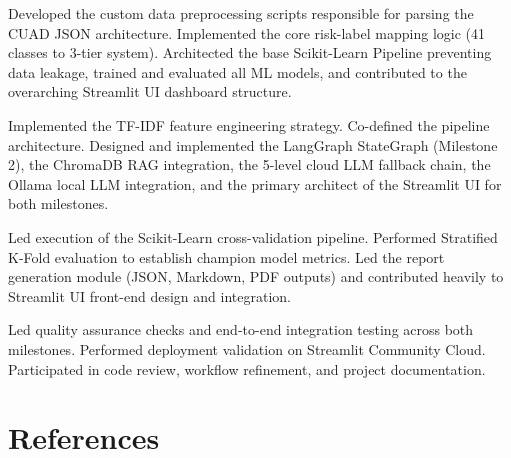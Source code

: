 \documentclass[12pt,a4paper]{article}
\begin{document}
\begin{description}[style=multiline, leftmargin=4cm]

    \item[\textbf{Ashutosh Singh} \\ (2401010109)]
    Developed the custom data preprocessing scripts responsible for parsing the CUAD
    JSON architecture. Implemented the core risk-label mapping logic (41 classes to
    3-tier system). Architected the base Scikit-Learn Pipeline preventing data
    leakage, trained and evaluated all ML models, and contributed to the overarching
    Streamlit UI dashboard structure.

    \vspace{0.2cm}
    \item[\textbf{Ranvendra Pratap} \\ \textbf{Singh} \\ (2401010373)]
    Implemented the TF-IDF feature engineering strategy. Co-defined the pipeline
    architecture. Designed and implemented the LangGraph StateGraph (Milestone 2),
    the ChromaDB RAG integration, the 5-level cloud LLM fallback chain, the Ollama
    local LLM integration, and the primary architect of the Streamlit UI for both
    milestones.

    \vspace{0.2cm}
    \item[\textbf{Shreya Suman} \\ (2401020068)]
    Led execution of the Scikit-Learn cross-validation pipeline. Performed Stratified
    K-Fold evaluation to establish champion model metrics. Led the report generation
    module (JSON, Markdown, PDF outputs) and contributed heavily to Streamlit UI
    front-end design and integration.

    \vspace{0.2cm}
    \item[\textbf{Avishkar Meher} \\ (2401010116)]
    Led quality assurance checks and end-to-end integration testing across both
    milestones. Performed deployment validation on Streamlit Community Cloud.
    Participated in code review, workflow refinement, and project documentation.

\end{description}

\section*{References}
\end{document}

